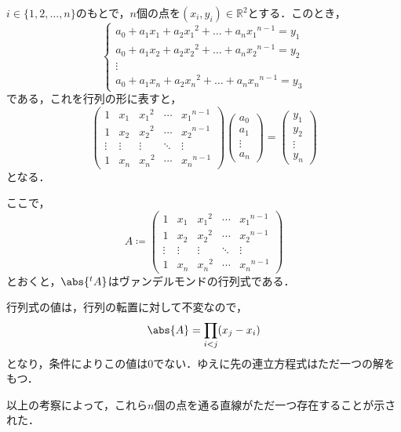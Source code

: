 \begin{tproof}
  $i \in \{ 1,2,\ldots,n \}$のもとで，$n$個の点を$(x_i , y_i ) \in \mathbb{R}^2$とする．このとき，
  \[
    \begin{cases}
      a_0 + a_1 x_1 + a_2 {x_1}^2 + \dots + a_n {x_1}^{n-1} = y_1 \\
      a_0 + a_1 x_2 + a_2 {x_2}^2 + \dots + a_n {x_2}^{n-1} = y_2 \\
      \vdots                                                      \\
      a_0 + a_1 x_n + a_2 {x_n}^2 + \dots + a_n {x_n}^{n-1} = y_3
    \end{cases}
  \]
  である，これを行列の形に表すと，
  \[
    \begin{pmatrix}
      1      & x_1    & {x_1}^2 & \cdots & {x_1}^{n-1} \\
      1      & x_2    & {x_2}^2 & \cdots & {x_2}^{n-1} \\
      \vdots & \vdots & \vdots  & \ddots & \vdots      \\
      1      & x_n    & {x_n}^2 & \cdots & {x_n}^{n-1}
    \end{pmatrix}
    \begin{pmatrix}
      a_0    \\
      a_1    \\
      \vdots \\
      a_n
    \end{pmatrix}
    =
    \begin{pmatrix}
      y_1    \\
      y_2    \\
      \vdots \\
      y_n
    \end{pmatrix}
  \]
  となる．

  ここで，
  \[
    A \coloneqq
    \begin{pmatrix}
      1      & x_1    & {x_1}^2 & \cdots & {x_1}^{n-1} \\
      1      & x_2    & {x_2}^2 & \cdots & {x_2}^{n-1} \\
      \vdots & \vdots & \vdots  & \ddots & \vdots      \\
      1      & x_n    & {x_n}^2 & \cdots & {x_n}^{n-1}
    \end{pmatrix}
  \]
  とおくと，$\abs{{}^t A}$はヴァンデルモンドの行列式である．

  行列式の値は，行列の転置に対して不変なので，
  \[
    \abs{A}= \prod_{i < j} (x_j - x_i)
  \]
  となり，条件によりこの値は$0$でない．ゆえに先の連立方程式はただ一つの解をもつ．

  以上の考察によって，これら$n$個の点を通る直線がただ一つ存在することが示された．
\end{tproof}



